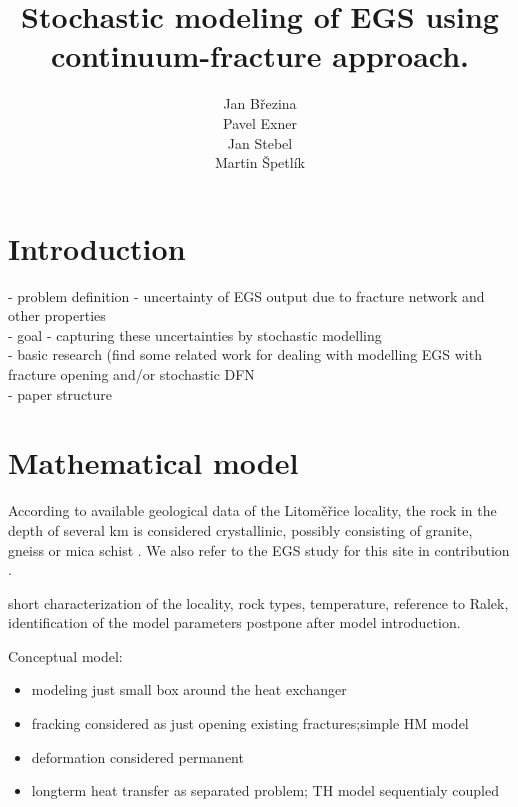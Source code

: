 \documentclass{article}
\title{Stochastic modeling of EGS using continuum-fracture approach.}
\author{
  Jan Březina \\
  \And
  Pavel Exner \\
  \And
  Jan Stebel \\
  \And
  Martin Špetlík \\
}
\newcommand{\todo}[1]{{\color{red}#1}}
\begin{document}
\maketitle

\begin{abstract}

\end{abstract}




\section{Introduction}
\todo{
- problem definition - uncertainty of EGS output due to  fracture network and other properties\\
- goal - capturing these uncertainties by stochastic modelling\\
- basic research (find some related work for dealing with modelling EGS with fracture opening and/or stochastic DFN\\
- paper structure\\
}


\section{Mathematical model}
According to available geological data of the Litoměřice locality, the rock in the depth of several km is considered crystallinic, possibly consisting of granite, gneiss or mica schist \cite{Capova2013}. %
We also refer to the EGS study for this site in  contribution \cite{Ralek}.  

\todo{short characterization of the locality, rock types,  temperature, reference to Ralek, identification of the model parameters postpone after model introduction.}

\todo{Conceptual model:

\begin{itemize}
    \item modeling just small box around the heat exchanger
    \item fracking considered as just opening existing fractures;simple HM model
    \item deformation considered permanent
    \item longterm heat transfer as separated problem;
          TH model sequentialy coupled
\end{itemize}
}
\end{document}
